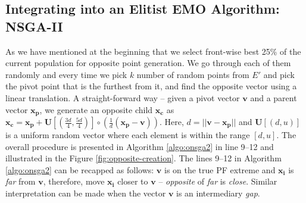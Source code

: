 \documentclass{sig-alternate-05-2015}
\begin{document}
\subsection{Integrating into an Elitist EMO Algorithm: NSGA-II}
\label{sec:onsga2r}
As we have mentioned at the beginning that we select front-wise best 25\% of the current population for opposite point generation. We go through each of them randomly and every time we pick \(k\) number of random points from \(E'\) and pick the pivot point that is the furthest from it, and find the opposite vector using a linear translation. A straight-forward way -- given a pivot vector \(\mathbf{v}\) and a parent vector \(\mathbf{x_p}\), we generate an opposite child \(\mathbf{x_c}\) as \(\mathbf{x_c} = \mathbf{x_p} + \mathbf{U}[(\frac{3d}{4}, \frac{5d}{4})] \circ (\frac{1}{d}(\mathbf{x_p} - \mathbf{v}))\). Here, \(d = ||\mathbf{v} - \mathbf{x_p}||\) and \(\mathbf{U}[(d,u)]\) is a uniform random vector where each element is within the range \([d,u]\). The overall procedure is presented in Algorithm \ref{algo:onsga2} in line 9--12 and illustrated in the Figure \ref{fig:opposite-creation}. The lines 9--12 in Algorithm \ref{algo:onsga2} can be recapped as follows: \(\mathbf{v}\) is on the true PF extreme and \(\mathbf{x_i}\) is \textit{far} from \(\mathbf{v}\), therefore, move \(\mathbf{x_i}\) closer to \(\mathbf{v}\) -- \textit{opposite} of \textit{far} is \textit{close}. Similar interpretation can be made when the vector \(\mathbf{v}\) is an intermediary \textit{gap}. 
%
\end{document}
